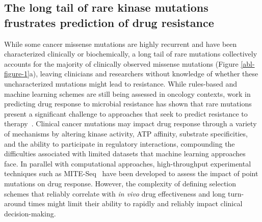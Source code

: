 \documentclass[phd,tocprelim]{cornell}
\begin{document}
\subsection{The long tail of rare kinase mutations frustrates prediction of drug resistance}
  While some cancer missense mutations are highly recurrent and have been characterized clinically or biochemically, a long tail of rare mutations collectively accounts for the majority of clinically observed missense mutations (Figure \ref{abl-figure-1}a), leaving clinicians and researchers without knowledge of whether these uncharacterized mutations might lead to resistance.
  While rules-based and machine learning schemes are still being assessed in oncology contexts, work in predicting drug response to microbial resistance has shown that rare mutations present a significant challenge to approaches that seek to predict resistance to therapy~\citep{Pesesky:Front.Microbiol.:2016}.
    Clinical cancer mutations may impact drug response through a variety of mechanisms by altering kinase activity, ATP affinity, substrate specificities, and the ability to participate in regulatory interactions, compounding the difficulties associated with limited datasets that machine learning approaches face.
  In parallel with computational approaches, high-throughput experimental techniques such as MITE-Seq~\citep{Melnikov:NucleicAcidsRes.:2014} have been developed to assess the impact of point mutations on drug response. 
  However, the complexity of defining selection schemes that reliably correlate with \emph{in vivo} drug effectiveness and long turn-around times might limit their ability to rapidly and reliably impact clinical decision-making.
\end{document}
